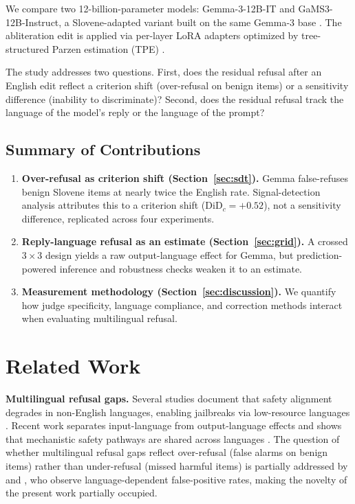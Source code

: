 \documentclass[11pt,letterpaper]{article}
\begin{document}
We compare two 12-billion-parameter models: Gemma-3-12B-IT \citep{Kamath2025} and GaMS3-12B-Instruct, a Slovene-adapted variant built on the same Gemma-3 base \citep{Vres2026}. The abliteration edit is applied via per-layer LoRA adapters optimized by tree-structured Parzen estimation (TPE) \citep{Akiba2019, Hu2021}.

The study addresses two questions. First, does the residual refusal after an English edit reflect a criterion shift (over-refusal on benign items) or a sensitivity difference (inability to discriminate)? Second, does the residual refusal track the language of the model's reply or the language of the prompt?

\subsection{Summary of Contributions}

\begin{enumerate}
    \item \textbf{Over-refusal as criterion shift (Section~\ref{sec:sdt}).} Gemma false-refuses benign Slovene items at nearly twice the English rate. Signal-detection analysis attributes this to a criterion shift ($\text{DiD}_c = +0.52$), not a sensitivity difference, replicated across four experiments.
    \item \textbf{Reply-language refusal as an estimate (Section~\ref{sec:grid}).} A crossed $3 \times 3$ design yields a raw output-language effect for Gemma, but prediction-powered inference and robustness checks weaken it to an estimate.
    \item \textbf{Measurement methodology (Section~\ref{sec:discussion}).} We quantify how judge specificity, language compliance, and correction methods interact when evaluating multilingual refusal.
\end{enumerate}

\section{Related Work}

\textbf{Multilingual refusal gaps.} Several studies document that safety alignment degrades in non-English languages, enabling jailbreaks via low-resource languages \citep{Yong2023, Deng2023, Shen2024, Wang2023}. Recent work separates input-language from output-language effects \citep{Marchisio2024, Ifebi2026, Zhang2026} and shows that mechanistic safety pathways are shared across languages \citep{Miao2026, Upadhyaya2026, Wang2025}. The question of whether multilingual refusal gaps reflect over-refusal (false alarms on benign items) rather than under-refusal (missed harmful items) is partially addressed by \citet{Im2026} and \citet{Zhang2025}, who observe language-dependent false-positive rates, making the novelty of the present work partially occupied.
\end{document}
